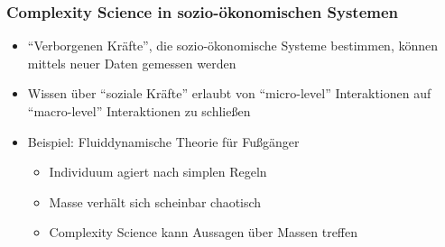 \begin{frame}
	\frametitle{Complexity Science in sozio-ökonomischen Systemen}
	\begin{itemize}
		\item
			\enquote{Verborgenen Kräfte}, die sozio-ökonomische Systeme bestimmen, können  mittels neuer Daten gemessen werden
		\item
			Wissen über \enquote{soziale Kräfte} erlaubt von \enquote{micro-level} Interaktionen auf \enquote{macro-level} Interaktionen zu schließen
		\item
			Beispiel: Fluiddynamische Theorie für Fußgänger
			\begin{itemize}
				\item
					Individuum agiert nach simplen Regeln
				\item
					Masse verhält sich scheinbar chaotisch
				\item
					Complexity Science kann Aussagen über Massen treffen
			\end{itemize}

	\end{itemize}
\end{frame}
